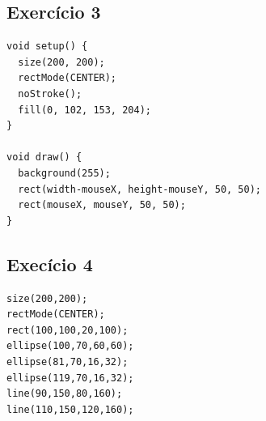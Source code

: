 \documentclass[12pt]{article}
\begin{document}
\subsection{Exercício 3}

\qquad \begin{verbatim}
void setup() {
  size(200, 200);
  rectMode(CENTER);
  noStroke();
  fill(0, 102, 153, 204);
}

void draw() {
  background(255);
  rect(width-mouseX, height-mouseY, 50, 50);
  rect(mouseX, mouseY, 50, 50);
}
\end{verbatim}

\subsection{Execício 4}

\begin{verbatim}
size(200,200);
rectMode(CENTER);
rect(100,100,20,100);
ellipse(100,70,60,60);
ellipse(81,70,16,32); 
ellipse(119,70,16,32); 
line(90,150,80,160);
line(110,150,120,160);
\end{verbatim}
\end{document}
